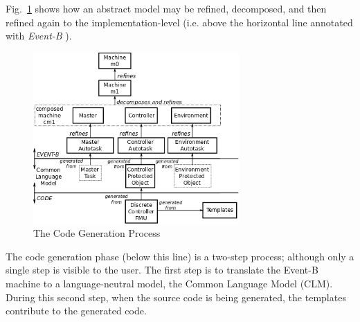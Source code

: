 \documentclass{llncs}%
\begin{document}
Fig.~\ref{fig:CGProcess} shows how an abstract model may be refined, decomposed, and then refined again to the implementation-level (i.e. above the horizontal line annotated with \emph{Event-B} ).
%
\begin{figure}
\centering
\includegraphics[width=0.7\textwidth]{devel.png}
\caption{The Code Generation Process}
\label{fig:CGProcess}
\vspace*{-12pt}
\end{figure}
The code generation phase (below this line) is a two-step process; although only a single step is visible to the user. The first step is to translate the Event-B machine to a language-neutral model, the Common Language Model (CLM). During this second step, when the source code is being generated, the templates contribute to the generated code. 
\end{document}
